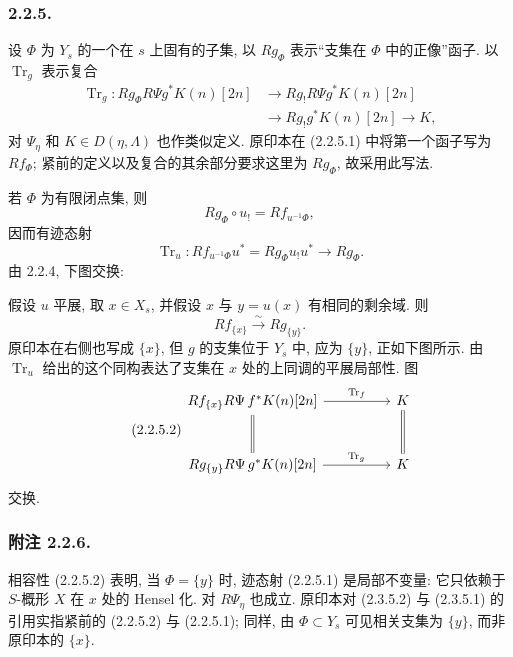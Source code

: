 \subsubsection*{2.2.5.}
设 $\Phi$ 为 $Y_s$ 的一个在 $s$ 上固有的子集, 以 $Rg_\Phi$ 表示“支集在 $\Phi$ 中的正像”函子. 以 $\operatorname{Tr}_g$ 表示复合
\begin{equation}\tag{2.2.5.1}
\begin{split}
\operatorname{Tr}_g:
Rg_\Phi R\Psi g^*K(n)[2n]
&\longrightarrow Rg_!R\Psi g^*K(n)[2n] \\
&\longrightarrow Rg_!g^*K(n)[2n]
\longrightarrow K,
\end{split}
\end{equation}
对 $\Psi_\eta$ 和 $K\in D(\eta,\Lambda)$ 也作类似定义. 原印本在 (2.2.5.1) 中将第一个函子写为 $Rf_\Phi$; 紧前的定义以及复合的其余部分要求这里为 $Rg_\Phi$, 故采用此写法.

若 $\Phi$ 为有限闭点集, 则
\[
Rg_\Phi\circ u_!=Rf_{u^{-1}\Phi},
\]
因而有迹态射
\[
\operatorname{Tr}_u:
Rf_{u^{-1}\Phi}u^*=Rg_\Phi u_!u^*\longrightarrow Rg_\Phi.
\]
由 2.2.4, 下图交换:
\begin{center}
\end{center}

假设 $u$ 平展, 取 $x\in X_s$, 并假设 $x$ 与 $y=u(x)$ 有相同的剩余域. 则
\[
Rf_{\{x\}}\xrightarrow{\ \sim\ }Rg_{\{y\}}.
\]
原印本在右侧也写成 $\{x\}$, 但 $g$ 的支集位于 $Y_s$ 中, 应为 $\{y\}$, 正如下图所示. 由 $\operatorname{Tr}_u$ 给出的这个同构表达了支集在 $x$ 处的上同调的平展局部性. 图
\begin{equation}\tag{2.2.5.2}
\begin{tikzcd}[column sep=huge, row sep=large]
Rf_{\{x\}}R\Psi\,f^*K(n)[2n]
  \arrow[r, "\operatorname{Tr}_f"] \arrow[d, equal]
  & K \arrow[d, equal] \\
Rg_{\{y\}}R\Psi\,g^*K(n)[2n]
  \arrow[r, "\operatorname{Tr}_g"]
  & K
\end{tikzcd}
\end{equation}
交换.

\subsubsection*{附注 2.2.6.}
相容性 (2.2.5.2) 表明, 当 $\Phi=\{y\}$ 时, 迹态射 (2.2.5.1) 是局部不变量: 它只依赖于 $S$-概形 $X$ 在 $x$ 处的 Hensel 化. 对 $R\Psi_\eta$ 也成立. 原印本对 (2.3.5.2) 与 (2.3.5.1) 的引用实指紧前的 (2.2.5.2) 与 (2.2.5.1); 同样, 由 $\Phi\subset Y_s$ 可见相关支集为 $\{y\}$, 而非原印本的 $\{x\}$.

